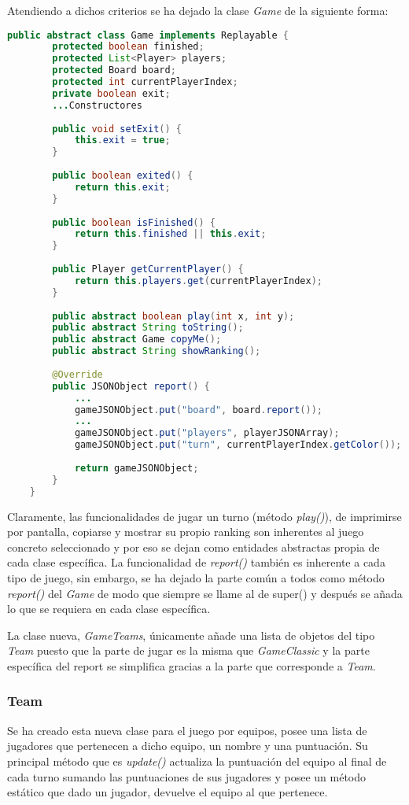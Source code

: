 \documentclass{article}
\begin{document}
Atendiendo a dichos criterios se ha dejado la clase \textit{Game} de la siguiente forma:
\begin{lstlisting}[language=Java]
	public abstract class Game implements Replayable {
		protected boolean finished;
		protected List<Player> players;
		protected Board board;
		protected int currentPlayerIndex;
		private boolean exit;
		...Constructores
		
		public void setExit() {
			this.exit = true;
		}	
	
		public boolean exited() {
			return this.exit;
		}
		
		public boolean isFinished() {
			return this.finished || this.exit;
		}
			
		public Player getCurrentPlayer() {
			return this.players.get(currentPlayerIndex);
		}
		
		public abstract boolean play(int x, int y);
		public abstract String toString();
		public abstract Game copyMe();
		public abstract String showRanking();
		
		@Override
		public JSONObject report() {
			...		
			gameJSONObject.put("board", board.report());
			...					
			gameJSONObject.put("players", playerJSONArray);		
			gameJSONObject.put("turn", currentPlayerIndex.getColor());
			
			return gameJSONObject;
		}
	}
\end{lstlisting}

Claramente, las funcionalidades de jugar un turno (método \textit{play()}), de imprimirse por pantalla, copiarse y mostrar su propio ranking son inherentes al juego concreto seleccionado y por eso se dejan como entidades abstractas propia de cada clase específica. La funcionalidad de \textit{report()} también es inherente a cada tipo de juego, sin embargo, se ha dejado la parte común a todos como método \textit{report()} del \textit{Game} de modo que siempre se llame al de super() y después se añada lo que se requiera en cada clase específica.

La clase nueva, \textit{GameTeams}, únicamente añade una lista de objetos del tipo \textit{Team} puesto que la parte de jugar es la misma que \textit{GameClassic} y la parte específica del report se simplifica gracias a la parte que corresponde a \textit{Team}.

\subsubsection*{Team}
Se ha creado esta nueva clase para el juego por equipos, posee una lista de jugadores que pertenecen a dicho equipo, un nombre y una puntuación. Su principal método que es \textit{update()} actualiza la puntuación del equipo al final de cada turno sumando las puntuaciones de sus jugadores y posee un método estático que dado un jugador, devuelve el equipo al que pertenece.
\end{document}
